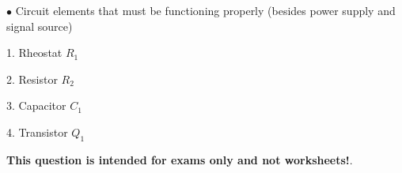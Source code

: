 \medskip
\goodbreak
\item{$\bullet$} Circuit elements that must be functioning properly (besides power supply and signal source)
\item{1.} Rheostat $R_1$
\item{2.} Resistor $R_2$
\item{3.} Capacitor $C_1$
\item{4.} Transistor $Q_1$
\medskip







{\bf This question is intended for exams only and not worksheets!}.



